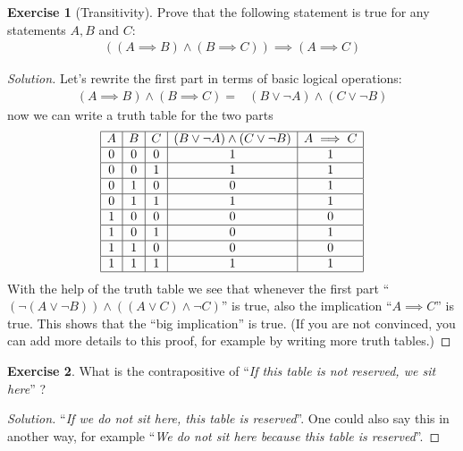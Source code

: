 \documentclass[a4paper,oneside]{article}
\theoremstyle{definition} \newtheorem{exercise}{Exercise}[section]
\begin{document}
\begin{exercise}[Transitivity]
  Prove that the following statement is true for any statements $A,B$ and $C$:
  \begin{align*}
    ((A\implies B)\land (B\implies C))\implies (A\implies C)
  \end{align*}
\end{exercise}
\begin{proof}[Solution]
  Let's rewrite the first part in terms of basic logical operations:
  \begin{align*}
    (A\implies B)\land (B\implies C)=&(B\lor \neg A)\land(C\lor \neg B)
  \end{align*}
  now we can write a truth table for the two parts
  \begin{align*}
    \begin{array}{|c|c|c|c|c|}
      \hline
      A & B & C & (B\lor\neg A)\land(C\lor\neg B) & A\implies C \\
      \hline
      0 & 0 & 0 & 1 & 1 \\
      \hline
      0 & 0 & 1 & 1 & 1 \\
      \hline
      0 & 1 & 0 & 0 & 1 \\
      \hline
      0 & 1 & 1 & 1 & 1 \\
      \hline
      1 & 0 & 0 & 0 & 0 \\
      \hline
      1 & 0 & 1 & 0 & 1 \\
      \hline
      1 & 1 & 0 & 0 & 0 \\
      \hline
      1 & 1 & 1 & 1 & 1 \\
      \hline
    \end{array}
  \end{align*}
  With the help of the truth table we see that whenever the first part
  ``$(\neg (A\lor \neg B))\land ((A\lor C) \land \neg C)$'' is true, also the
  implication ``$A\implies C$'' is true. This shows that the ``big
  implication'' is true. (If you are not convinced, you can add more details to
  this proof, for example by writing more truth tables.)
\end{proof}

\begin{exercise}
What is the contrapositive of ``\emph{If this table is not reserved, we sit
here}'' ?
\end{exercise}
\begin{proof}[Solution]
  ``\emph{If we do not sit here, this table is reserved}''. One could also say
  this in another way, for example ``\emph{We do not sit here because this
  table is reserved}''.
\end{proof}
\end{document}
